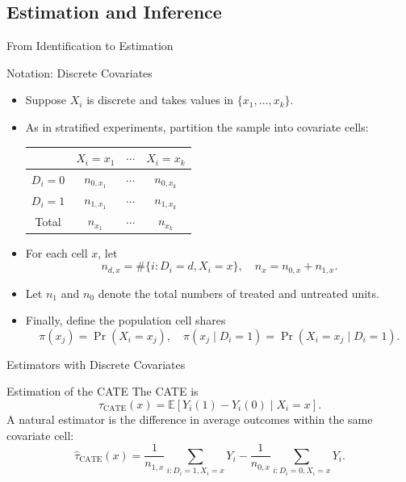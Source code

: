 \documentclass[11pt,aspectratio=169]{beamer}
\begin{document}
\subsection{Estimation and Inference}
\begin{frame}{From Identification to Estimation}



\end{frame}
\begin{frame}{Notation: Discrete Covariates}

\begin{itemize}
    \item Suppose $X_i$ is discrete and takes values in $\{x_1, \dots, x_k\}$.
    \item As in stratified experiments, partition the sample into covariate cells:
    \begin{center}
    \begin{tabular}{c|ccc}
    & $X_i = x_1$ & $\cdots$ & $X_i = x_k$ \\
    \hline
    $D_i = 0$ & $n_{0,x_1}$ & $\cdots$ & $n_{0,x_k}$ \\
    $D_i = 1$ & $n_{1,x_1}$ & $\cdots$ & $n_{1,x_k}$ \\
    \hline
    Total & $n_{x_1}$ & $\cdots$ & $n_{x_k}$
    \end{tabular}
    \end{center}
    \item For each cell $x$, let
    $$n_{d,x} = \#\{i : D_i = d, X_i = x\}, \quad n_x = n_{0,x} + n_{1,x}.$$
    \item Let $n_1$ and $n_0$ denote the total numbers of treated and untreated units.
    \item Finally, define the population cell shares
    $$\pi(x_j) = \Pr(X_i = x_j), \quad \pi(x_j \mid D_i = 1) = \Pr(X_i = x_j \mid D_i = 1).$$
\end{itemize}

\end{frame}


\begin{frame}{Estimators with Discrete Covariates}

\begin{definitionbox}{Estimation of the CATE}
The CATE is
$$\tau_{\text{CATE}}(x) = \mathbb{E}[Y_i(1) - Y_i(0) \mid X_i = x].$$
A natural estimator is the difference in average outcomes within the same covariate cell:
$$\widehat{\tau}_{\text{CATE}}(x) = \frac{1}{n_{1,x}} \sum_{i:D_i=1, X_i=x} Y_i - \frac{1}{n_{0,x}} \sum_{i:D_i=0, X_i=x} Y_i.$$
\end{definitionbox}
\end{frame}
\end{document}
